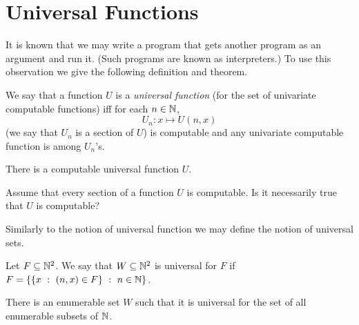 \chapter{Universal Functions}
It is known that we may write a program that gets another program as an argument
and run it. (Such programs are known as interpreters.) To use this observation
we give the following definition and theorem.
\begin{definition}
  We say that a function $U$ is a \emph{universal function} (for the set of
  univariate computable functions) iff for each $n \in {\mathbb{N}}$,
  \[
    U_n : x \mapsto U(n, x)
  \]
  (we say that $U_n$ is a section of $U$)
  is computable and any univariate computable function is among $U_n$'s.
\end{definition}

\begin{theorem}
\label{theorem:universal-function-computable}
  There is a computable universal function $U$.
\end{theorem}

\begin{exercise}
  Assume that every section of a function $U$ is computable.
  Is it necessarily true that $U$ is computable?
\end{exercise}

Similarly to the notion of universal function we may define the notion
of universal sets.
\begin{definition}
  Let $F \subseteq {\mathbb{N}}^2$. We say that $W \subseteq {\mathbb{N}}^2$ is universal for $F$
  if $F = \set[n \in \N]{\set[(n, x) \in F]{x}}$.
\end{definition}

\begin{theorem}
  There is an enumerable set $W$ such that it is universal for the set of
  all enumerable subsets of ${\mathbb{N}}$.
\end{theorem}

